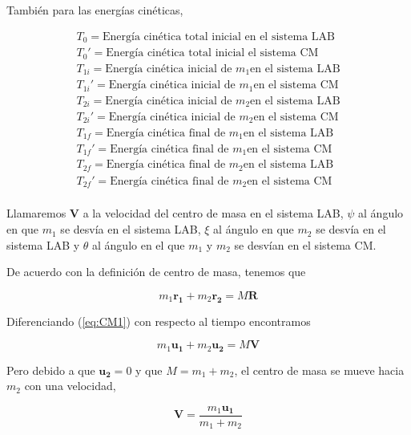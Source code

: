 \documentclass[a4paper,10pt]{article}
\begin{document}
También para las energías cinéticas,
 
 \begin{gather*}
  T_0 = \textrm{Energía cinética total inicial en el sistema LAB} \\
  T_0' = \textrm{Energía cinética total inicial el sistema CM} \\
%  
%  
   T_{1i} = \textrm{Energía cinética inicial de } m_1 \textrm{en el sistema LAB} \\
   T_{1i}' = \textrm{Energía cinética inicial de } m_1 \textrm{en el sistema CM} \\
%   
   T_{2i} = \textrm{Energía cinética inicial de } m_2 \textrm{en el sistema LAB} \\
   T_{2i}' = \textrm{Energía cinética inicial de } m_2 \textrm{en el sistema CM} \\
%  
  T_{1f} = \textrm{Energía cinética final de } m_1 \textrm{en el sistema LAB} \\
  T_{1f}' = \textrm{Energía cinética final de } m_1 \textrm{en el sistema CM} \\
%  
  T_{2f} = \textrm{Energía cinética final de } m_2 \textrm{en el sistema LAB} \\
  T_{2f}' = \textrm{Energía cinética final de } m_2 \textrm{en el sistema CM} \\
%
\label{eq:energiasCineticas}
  \end{gather*}

Llamaremos $\textbf{V}$ a la velocidad del centro de masa en el sistema LAB, $\psi$ al 
ángulo en que $m_1$ se desvía en el sistema LAB, $\xi$ al ángulo en que $m_2$ se desvía
en el sistema LAB y $\theta$ al ángulo en el que $m_1$ y $m_2$ se desvían en el sistema CM.

De acuerdo con la definición de centro de masa, tenemos que

\begin{equation}
 m_1 \mathbf{r_1} + m_2 \mathbf{r_2} = M\mathbf{R}
 \label{eq:CM1}
\end{equation}

Diferenciando (\ref{eq:CM1}) con respecto al tiempo encontramos

\begin{equation}
 m_1 \mathbf{u_1} + m_2 \mathbf{u_2} = M\mathbf{V}
 \label{eq:CMVel1}
\end{equation}

Pero debido a que $\mathbf{u_2}=0$ y que $M=m_1+m_2$, el centro de masa se mueve
hacia $m_2$ con una velocidad,

\begin{equation}
\mathbf{V} = \frac{m_1 \mathbf{u_1}}{m_1+m_2}
 \label{eq:CMVel2}
\end{equation}
\end{document}
